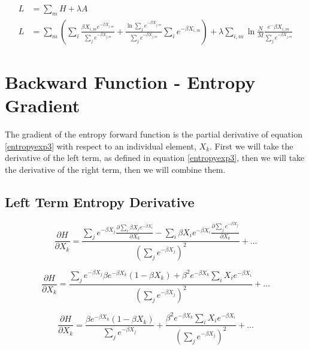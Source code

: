 \begin{equation}
\begin{aligned}
    L &= \sum_{m} H + \lambda A \\
    L &= \sum_{m}\left( \sum_{i}\frac{\beta X_{i,m}e^{-\beta X_{i,m}}}{\sum_{j}e^{-\beta X_{j,m}}} +
    \frac{\ln{\sum_{j}e^{-\beta X_{j,m}}}}{\sum_{j}e^{-\beta X_{j,m}}} \sum_{i}e^{-\beta X_{i,m}} \right) +
    \lambda \sum_{i,m} \ln{\frac{N}{M} \frac{e^-\beta X_{i,m}}{\sum_{j}e^{-\beta X_{j,m}}}}
\label{totalloss}
\end{aligned}
\end{equation}

\section{Backward Function - Entropy Gradient} \label{backward}
\noindent The gradient of the entropy forward function is the partial derivative of equation \ref{entropyexp3} with respect to an individual element, $X_{k}$. First we will take the derivative of the left term, as defined in equation \ref{entropyexp3}, then we will take the derivative of the right term, then we will combine them.

\subsection{Left Term Entropy Derivative}


\begin{displaymath}
    \frac{\partial H}{\partial X_{k}} =
    \frac{\sum_{j}e^{-\beta X_{j}}\frac{\partial\sum_{i}\beta X_{i} e^{-\beta X_{i}}}{\partial X_{k}}
    - \sum_{i}\beta X_{i} e^{-\beta X_{i}}\frac{\partial\sum_{j}e^{-\beta X_{j}}}{\partial X_{k}}}{\left(\sum_{j}e^{-\beta X_{j}}\right)^{2}}
    + \ldots
\end{displaymath}

\begin{displaymath}
    \frac{\partial H}{\partial X_{k}} =
    \frac{\sum_{j}e^{-\beta X_{j}} \beta e^{-\beta X_{k}}\left(1 - \beta X_{k}\right) + \beta^{2} e^{-\beta X_{k}} \sum_{i}X_{i}e^{-\beta X_{i}}}{\left(\sum_{j}e^{-\beta X_{j}}\right)^{2}}
    + \ldots
\end{displaymath}

\begin{displaymath}
    \frac{\partial H}{\partial X_{k}} =
    \frac{\beta e^{-\beta X_{k}}\left(1 - \beta X_{k}\right)}{\sum_{j}e^{-\beta X_{j}}}
    + \frac{\beta^{2} e^{-\beta X_{k}} \sum_{i}X_{i}e^{-\beta X_{i}}}{\left(\sum_{j}e^{-\beta X_{j}}\right)^{2}}
    + \ldots
\end{displaymath}

